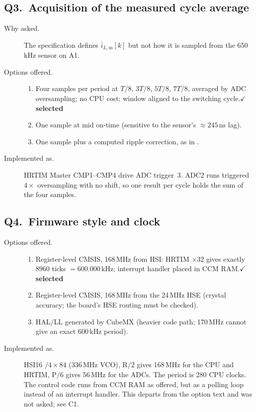 \documentclass[11pt]{article}
\newcommand{\code}[1]{\texttt{\detokenize{#1}}}
\newcommand{\chosen}{\hfill$\checkmark$\,\textbf{selected}}
\begin{document}
\subsection*{Q3.\ Acquisition of the measured cycle average}
\begin{description}
\item[Why asked.] The specification defines
$\bar{i}_{L,\mathrm{m}}[k]$ but not how it is sampled from the
650\,kHz sensor on A1.
\item[Options offered.]\leavevmode
  \begin{enumerate}
  \item Four samples per period at $T/8$, $3T/8$, $5T/8$, $7T/8$,
        averaged by ADC oversampling; no CPU cost; window aligned to
        the switching cycle.\chosen
  \item One sample at mid on-time (sensitive to the sensor's
        $\approx 245\,\mathrm{ns}$ lag).
  \item One sample plus a computed ripple correction, as in
        \code{Buck_Voltage_Mode}.
  \end{enumerate}
\item[Implemented as.] HRTIM Master CMP1--CMP4 drive ADC trigger~3.
ADC2 runs triggered $4\times$ oversampling with no shift, so one
result per cycle holds the sum of the four samples.
\end{description}

\subsection*{Q4.\ Firmware style and clock}
\begin{description}
\item[Options offered.]\leavevmode
  \begin{enumerate}
  \item Register-level CMSIS, 168\,MHz from HSI: HRTIM $\times 32$
        gives exactly $8960$ ticks $=600.000\,\mathrm{kHz}$; interrupt
        handler placed in CCM RAM.\chosen
  \item Register-level CMSIS, 168\,MHz from the 24\,MHz HSE (crystal
        accuracy; the board's HSE routing must be checked).
  \item HAL/LL generated by CubeMX (heavier code path; 170\,MHz cannot
        give an exact 600\,kHz period).
  \end{enumerate}
\item[Implemented as.] HSI16 $/4\times 84$ (336\,MHz VCO), R$/2$ gives
168\,MHz for the CPU and HRTIM, P$/6$ gives 56\,MHz for the ADCs. The
period is 280 CPU clocks. The control code runs from CCM RAM as offered,
but as a polling loop instead of an interrupt handler. This departs from
the option text and was not asked; see C1.
\end{description}
\end{document}
